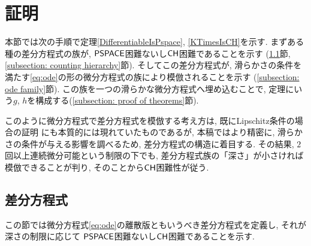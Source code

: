 \section{証明}
\label{section:differentiable}

本節では次の手順で定理\ref{DifferentiableIsPspace}, \ref{KTimesIsCH}を示す. 
まずある種の差分方程式の族が, 
$\mathsf{PSPACE}$困難ないし$\mathsf{CH}$困難であることを示す
(\ref{section:divp}節, \ref{subsection: counting hierarchy}節).
そしてこの差分方程式が, 
滑らかさの条件を満たす\eqref{eq:ode}の形の微分方程式の族により模倣されることを示す
(\ref{subsection: ode family}節). 
この族を一つの滑らかな微分方程式へ埋め込むことで, 
定理にいう$g$, $h$を構成する(\ref{subsection: proof of theorems}節).

このように微分方程式で差分方程式を模倣する考え方は, 
既にLipschitz条件の場合の証明
\cite{kawamura2010lipschitz}にも本質的には現れていたものであるが, 
本稿ではより精密に, 滑らかさの条件が与える影響を調べるため, 
差分方程式の構造に着目する. 
その結果, 
$2$回以上連続微分可能という制限の下でも, 
差分方程式族の「深さ」が小さければ模倣できることが判り, 
そのことから$\mathsf{CH}$困難性が従う. 

\subsection{差分方程式}
\label{section:divp}

この節では微分方程式\eqref{eq:ode}の離散版ともいうべき差分方程式を定義し, 
それが深さの制限に応じて
$\mathsf{PSPACE}$困難ないし$\mathsf{CH}$困難であることを示す.

